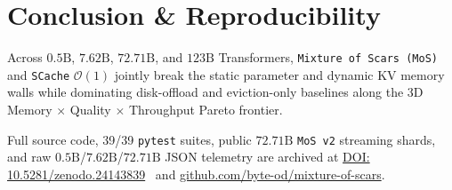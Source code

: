 \documentclass[10pt,twocolumn]{article}
\newif\ifanonymous
\begin{document}
\section{Conclusion \& Reproducibility}
Across $0.5\text{B}$, $7.62\text{B}$, $72.71\text{B}$, and $123\text{B}$ Transformers, \texttt{Mixture of Scars (MoS)} and \texttt{SCache} $\mathcal{O}(1)$ jointly break the static parameter and dynamic KV memory walls while dominating disk-offload and eviction-only baselines along the 3D Memory $\times$ Quality $\times$ Throughput Pareto frontier.
\ifanonymous
All code, 39/39 \texttt{pytest} suites, and raw JSON telemetry ($0.5\text{B}$, $7.62\text{B}$, $72.71\text{B}$) are provided in the anonymized supplementary archive.
\else
Full source code, 39/39 \texttt{pytest} suites, public $72.71\text{B}$ \texttt{MoS v2} streaming shards, and raw $0.5\text{B}$/$7.62\text{B}$/$72.71\text{B}$ JSON telemetry are archived at \href{https://doi.org/10.5281/zenodo.24143839}{DOI: 10.5281/zenodo.24143839}~\citep{reisfilho2026mos_zenodo} and \href{https://github.com/byte-od/mixture-of-scars}{github.com/byte-od/mixture-of-scars}.
\fi



\end{document}
